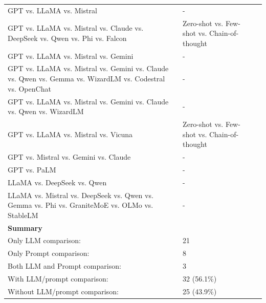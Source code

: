 \begin{tabular} { p{} p{} p{} }
GPT vs. LLaMA vs. Mistral & - & \cite{ \papertwohundredtwentysecond }\\ 
GPT vs. LLaMA vs. Mistral vs. Claude vs. DeepSeek vs. Qwen vs. Phi vs. Falcon & Zero-shot vs. Few-shot vs. Chain-of-thought & \cite{ \papernineteenth }\\ 
GPT vs. LLaMA vs. Mistral vs. Gemini & - & \cite{ \paperonehundredfiftysixth }\\ 
GPT vs. LLaMA vs. Mistral vs. Gemini vs. Claude vs. Qwen vs. Gemma vs. WizardLM vs. Codestral vs. OpenChat & - & \cite{ \paperthirtyfirst }\\ 
GPT vs. LLaMA vs. Mistral vs. Gemini vs. Claude vs. Qwen vs. WizardLM & - & \cite{ \paperonehundredninetyeighth }\\ 
GPT vs. LLaMA vs. Mistral vs. Vicuna & Zero-shot vs. Few-shot vs. Chain-of-thought & \cite{ \papertwentythird }\\ 
GPT vs. Mistral vs. Gemini vs. Claude & - & \cite{ \papertwohundredfortysecond }\\ 
GPT vs. PaLM & - & \cite{ \paperonehundredtwentyninth }\\ 
LLaMA vs. DeepSeek vs. Qwen & - & \cite{ \paperonehundredfortythird }\\ 
LLaMA vs. Mistral vs. DeepSeek vs. Qwen vs. Gemma vs. Phi vs. GraniteMoE vs. OLMo vs. StableLM & - & \cite{ \papertwohundredthirteenth }\\ 
\midrule 
\textbf{Summary} & & \\ 
Only LLM comparison: & 21& \\ 
Only Prompt comparison: & 8& \\ 
Both LLM and Prompt comparison: & 3& \\ 
With LLM/prompt comparison: & 32 (56.1\%) &\\ 
Without LLM/prompt comparison: & 25 (43.9\%) & \\ 
\bottomrule 
\end{tabular} 
